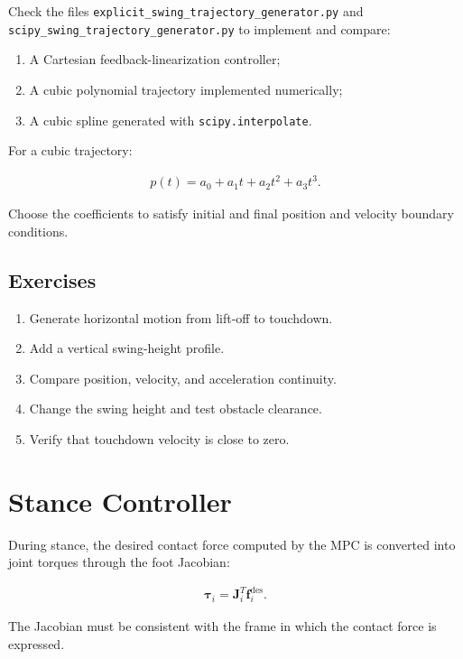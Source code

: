 \documentclass[11pt,a4paper]{article}
\begin{document}
Check the files \verb|explicit_swing_trajectory_generator.py| and \verb|scipy_swing_trajectory_generator.py| to
implement and compare:

\begin{enumerate}[label=\arabic*.]
    \item A Cartesian feedback-linearization controller;
    \item A cubic polynomial trajectory implemented numerically;
    \item A cubic spline generated with \texttt{scipy.interpolate}.
\end{enumerate}

For a cubic trajectory:

\begin{align*}
p(t) = a_0 + a_1t + a_2t^2 + a_3t^3.
\end{align*}

Choose the coefficients to satisfy initial and final position and velocity boundary conditions.

\subsection*{Exercises}

\begin{enumerate}[label=\arabic*.]
    \item Generate horizontal motion from lift-off to touchdown.
    \item Add a vertical swing-height profile.
    \item Compare position, velocity, and acceleration continuity.
    \item Change the swing height and test obstacle clearance.
    \item Verify that touchdown velocity is close to zero.
\end{enumerate}

\section{Stance Controller}

During stance, the desired contact force computed by the MPC is converted into joint torques through the foot Jacobian:

\begin{align*}
\bm{\tau}_i = \bm{J}_i^T \bm{f}_i^{\mathrm{des}}.
\end{align*}

The Jacobian must be consistent with the frame in which the contact force is expressed.
\end{document}
